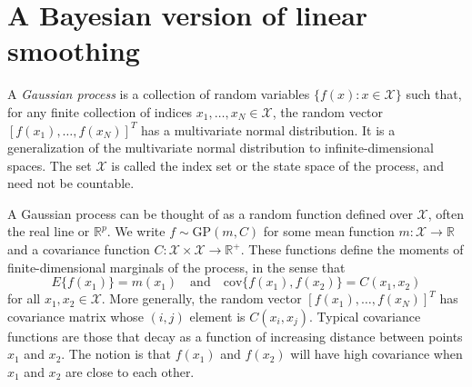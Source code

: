 \documentclass{mynotes}
\begin{document}
\section{A Bayesian version of linear smoothing}

A \textit{Gaussian process} is a collection of random variables $\{f(x): x \in \mathcal{X}\}$ such that, for any finite collection of indices $x_1, \ldots, x_N \in \mathcal{X}$, the random vector $[f(x_1), \ldots, f(x_N)]^T$ has a multivariate normal distribution.  It is a generalization of the multivariate normal distribution to infinite-dimensional spaces. The set $\mathcal{X}$ is called the index set or the state space of the process, and need not be countable.

A Gaussian process can be thought of as a random function defined over $\mathcal{X}$, often the real line or $\mathbb{R}^p$.  We write $f \sim \mbox{GP}(m, C)$ for some mean function $m: \mathcal{X} \rightarrow \mathbb{R}$ and a covariance function $C: \mathcal{X} \times \mathcal{X} \rightarrow \mathbb{R}^+$.  These functions define the moments of finite-dimensional marginals of the process, in the sense that
$$
E\{ f(x_1) \} = m(x_1) \quad \mbox{and} \quad \mbox{cov}\{f(x_1), f(x_2) \} = C(x_1, x_2)
$$
for all $x_1, x_2 \in \mathcal{X}$.  More generally, the random vector $[f(x_1), \ldots, f(x_N)]^T$ has covariance matrix whose $(i,j)$ element is $C(x_i, x_j)$.  Typical covariance functions are those that decay as a function of increasing distance between points $x_1$ and $x_2$.  The notion is that $f(x_1)$ and $f(x_2)$ will have high covariance when $x_1$ and $x_2$ are close to each other.
\end{document}
